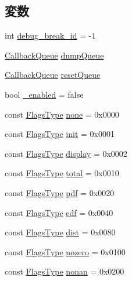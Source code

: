 \subsection*{変数}
\begin{DoxyCompactItemize}
\item 
int \hyperlink{namespaceStats_a7f54f6f0dfb010de4011aaad5d2922e8}{debug\_\-break\_\-id} = -\/1
\item 
\hyperlink{classCallbackQueue}{CallbackQueue} \hyperlink{namespaceStats_a4fbe68e945e186a583e0e4be24387628}{dumpQueue}
\item 
\hyperlink{classCallbackQueue}{CallbackQueue} \hyperlink{namespaceStats_a9d87f9de7107952b482c01c37e2b9598}{resetQueue}
\item 
bool \hyperlink{namespaceStats_a096e979db21287ad2b56b0ad270ac681}{\_\-enabled} = false
\item 
const \hyperlink{namespaceStats_ac52f827dcfea58febdc3860fd610dc09}{FlagsType} \hyperlink{namespaceStats_adaca029bee6973514c46aa649f669b21}{none} = 0x0000
\item 
const \hyperlink{namespaceStats_ac52f827dcfea58febdc3860fd610dc09}{FlagsType} \hyperlink{namespaceStats_aa1f55d332b4c8393735b7f1d87098beb}{init} = 0x0001
\item 
const \hyperlink{namespaceStats_ac52f827dcfea58febdc3860fd610dc09}{FlagsType} \hyperlink{namespaceStats_a4f0406c9859ba486a98825d53a233056}{display} = 0x0002
\item 
const \hyperlink{namespaceStats_ac52f827dcfea58febdc3860fd610dc09}{FlagsType} \hyperlink{namespaceStats_a4031dfee086a6a4cf1deea1fff2e0d5c}{total} = 0x0010
\item 
const \hyperlink{namespaceStats_ac52f827dcfea58febdc3860fd610dc09}{FlagsType} \hyperlink{namespaceStats_a148700bbb7b09b1ebb9d6b099155391a}{pdf} = 0x0020
\item 
const \hyperlink{namespaceStats_ac52f827dcfea58febdc3860fd610dc09}{FlagsType} \hyperlink{namespaceStats_af659db47be37cf4f7fee0a18e320843b}{cdf} = 0x0040
\item 
const \hyperlink{namespaceStats_ac52f827dcfea58febdc3860fd610dc09}{FlagsType} \hyperlink{namespaceStats_a25cf6f3e458aaa5fdf87fc287ef0376e}{dist} = 0x0080
\item 
const \hyperlink{namespaceStats_ac52f827dcfea58febdc3860fd610dc09}{FlagsType} \hyperlink{namespaceStats_aea66fede55fadabd06c458fb36736378}{nozero} = 0x0100
\item 
const \hyperlink{namespaceStats_ac52f827dcfea58febdc3860fd610dc09}{FlagsType} \hyperlink{namespaceStats_a8e574059d445838aa4d851c263cb0e78}{nonan} = 0x0200

\end{DoxyCompactItemize}
